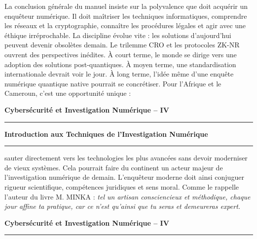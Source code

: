 \documentclass[12pt,a4paper]{article}
\newcommand{\HRule}{\rule{\linewidth}{1pt}}
\begin{document}
	\medskip
	\noindent
	La conclusion générale du manuel insiste sur la polyvalence que doit acquérir un enquêteur numérique. Il doit maîtriser les techniques informatiques, comprendre les réseaux et la cryptographie, connaître les procédures légales et agir avec une éthique irréprochable. La discipline évolue vite : les solutions d’aujourd’hui peuvent devenir obsolètes demain. Le trilemme CRO et les protocoles ZK-NR ouvrent des perspectives inédites. À court terme, le monde se dirige vers une adoption des solutions post-quantiques. À moyen terme, une standardisation internationale devrait voir le jour. À long terme, l’idée même d’une enquête numérique quantique native pourrait se concrétiser. Pour l’Afrique et le Cameroun, c’est une opportunité unique :
	
	\vfill
	
	\begin{flushleft}
		\textbf{Cybersécurité et Investigation Numérique -- IV}
		\HRule 
	\end{flushleft}  
	
	\newpage 
	
	\begin{flushright}
		\textbf{Introduction aux Techniques de l'Investigation Numérique}
		\HRule
	\end{flushright}
	
	\vspace{0.5cm}
	
	\medskip
	\noindent
	sauter directement vers les technologies les plus avancées sans devoir moderniser de vieux systèmes. Cela pourrait faire du continent un acteur majeur de l’investigation numérique de demain. L’enquêteur moderne doit ainsi conjuguer rigueur scientifique, compétences juridiques et sens moral. Comme le rappelle l'auteur du livre M. MINKA : \textit{tel un artisan consciencieux et méthodique, chaque jour affine ta pratique, car ce n’est qu’ainsi que tu seras et demeureras expert.}
	
	\vfill
	
	\begin{flushleft}
		\textbf{Cybersécurité et Investigation Numérique -- IV}
		\HRule 
	\end{flushleft}  
	
\end{document}
